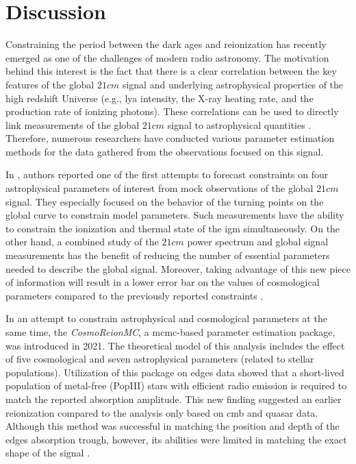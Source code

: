 \documentclass[12pt, TexShade, letterpaper]{report}
\begin{document}
\section{Discussion}
Constraining the period between the dark ages and reionization has recently emerged as one of the challenges of modern radio astronomy. The motivation behind this interest is the fact that there is a clear correlation between the key features of the global $21cm$ signal and underlying astrophysical properties of the high redshift Universe (e.g., \gls{lya} intensity, the X-ray heating rate, and the production rate of ionizing photons). These correlations can be used to directly link measurements of the global $21cm$ signal to astrophysical quantities \cite{chart_param_space}.
Therefore, numerous researchers have conducted various parameter estimation methods for the data gathered from the observations focused on this signal.\par

In \cite{pe_galaxy_formation}, authors reported one of the first attempts to forecast constraints on four astrophysical parameters of interest from mock observations of the global $21cm$ signal. They especially focused on the behavior of the turning points on the global curve to constrain model parameters. Such measurements have the ability to constrain the ionization and thermal state of the \gls{igm} simultaneously. On the other hand, a combined study of the $21cm$ power spectrum and global signal measurements has the benefit of reducing the number of essential parameters needed to describe the global signal. Moreover, taking advantage of this new piece of information will result in a lower error bar on the values of cosmological parameters compared to the previously reported constraints \cite{21cmpower_global_comnbine}. \par

In an attempt to constrain astrophysical and cosmological parameters at the same time, the \emph{CosmoReionMC}, a \gls{mcmc}-based parameter estimation package, was introduced in 2021. The theoretical model of this analysis includes the effect of five cosmological and seven astrophysical parameters (related to stellar populations). Utilization of this package on \gls{edges} data showed that a short-lived population of metal-free (PopIII) stars with efficient radio emission is required to match the reported absorption amplitude. This new finding suggested an earlier reionization compared to the analysis only based on \gls{cmb} and quasar data. Although this method was successful in matching the position and depth of the \gls{edges} absorption trough, however, its abilities were limited in matching the exact shape of the signal \cite{pe_mcmc_1}.\par
\end{document}
